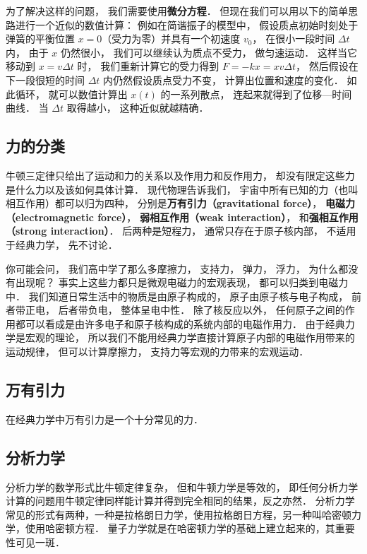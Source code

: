 为了解决这样的问题， 我们需要使用\textbf{微分方程}． 但现在我们可以用以下的简单思路进行一个近似的数值计算： 例如在简谐振子的模型中， 假设质点初始时刻处于弹簧的平衡位置 $x = 0$（受力为零）并具有一个初速度 $v_0$， 在很小一段时间 $\Delta t$ 内， 由于 $x$ 仍然很小， 我们可以继续认为质点不受力， 做匀速运动． 这样当它移动到 $x = v\Delta t$ 时， 我们重新计算它的受力得到 $F = -kx = x v \Delta t$， 然后假设在下一段很短的时间 $\Delta t$ 内仍然假设质点受力不变， 计算出位置和速度的变化． 如此循环， 就可以数值计算出 $x(t)$ 的一系列散点， 连起来就得到了位移—时间曲线． 当 $\Delta t$ 取得越小， 这种近似就越精确．

\subsection{力的分类}
牛顿三定律只给出了运动和力的关系以及作用力和反作用力， 却没有限定这些力是什么力以及该如何具体计算． 现代物理告诉我们， 宇宙中所有已知的力（也叫相互作用）都可以归为四种， 分别是\textbf{万有引力（gravitational force）}， \textbf{电磁力（electromagnetic force）}， \textbf{弱相互作用（weak interaction）}， 和\textbf{强相互作用（strong interaction）}． 后两种是短程力， 通常只存在于原子核内部， 不适用于经典力学， 先不讨论．

你可能会问， 我们高中学了那么多摩擦力， 支持力， 弹力， 浮力， 为什么都没有出现呢？ 事实上这些力都只是微观电磁力的宏观表现， 都可以归类到电磁力中． 我们知道日常生活中的物质是由原子构成的， 原子由原子核与电子构成， 前者带正电， 后者带负电， 整体呈电中性． 除了核反应以外， 任何原子之间的作用都可以看成是由许多电子和原子核构成的系统内部的电磁作用力． 由于经典力学是宏观的理论， 所以我们不能用经典力学直接计算原子内部的电磁作用带来的运动规律， 但可以计算摩擦力， 支持力等宏观的力带来的宏观运动．

\subsection{万有引力}
在经典力学中万有引力是一个十分常见的力．

\subsection{分析力学}
分析力学的数学形式比牛顿定律复杂， 但和牛顿力学是等效的， 即任何分析力学计算的问题用牛顿定律同样能计算并得到完全相同的结果，反之亦然． 分析力学常见的形式有两种，一种是拉格朗日力学，使用拉格朗日方程，另一种叫哈密顿力学，使用哈密顿方程． 量子力学就是在哈密顿力学的基础上建立起来的，其重要性可见一斑．%

